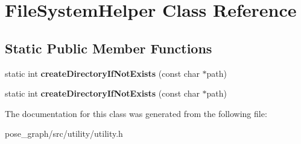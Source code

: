\hypertarget{classFileSystemHelper}{}\section{File\+System\+Helper Class Reference}
\label{classFileSystemHelper}
\subsection*{Static Public Member Functions}
\begin{DoxyCompactItemize}
\item 
\mbox{\label{classFileSystemHelper_a35653a643885e8b692a6b1481763c4f7}} 
static int {\bfseries create\+Directory\+If\+Not\+Exists} (const char $\ast$path)
\item 
\mbox{\label{classFileSystemHelper_a35653a643885e8b692a6b1481763c4f7}} 
static int {\bfseries create\+Directory\+If\+Not\+Exists} (const char $\ast$path)
\end{DoxyCompactItemize}


The documentation for this class was generated from the following file\+:\begin{DoxyCompactItemize}
\item 
pose\+\_\+graph/src/utility/utility.\+h\end{DoxyCompactItemize}
